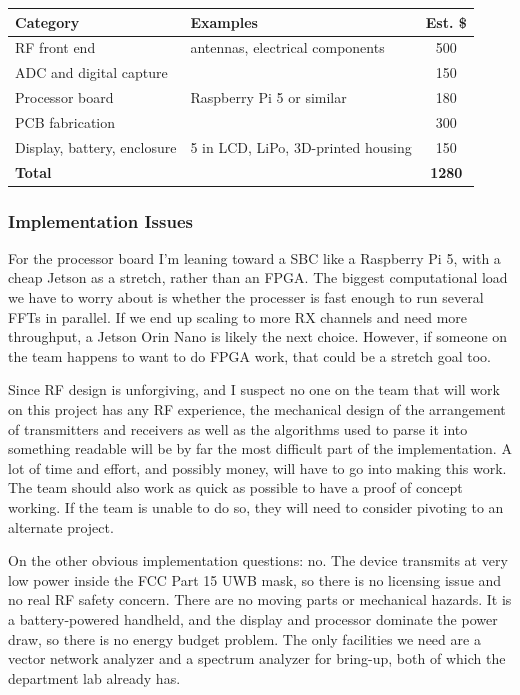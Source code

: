 \documentclass[11pt]{article}
\begin{document}
\begin{center}
\small
\begin{tabular}{p{5cm} p{8cm} c}
\hline
Category & Examples & Est. \$ \\
\hline
RF front end & antennas, electrical components & 500 \\
ADC and digital capture & & 150 \\
Processor board & Raspberry Pi 5 or similar & 180 \\
PCB fabrication & & 300 \\
Display, battery, enclosure & 5 in LCD, LiPo, 3D-printed housing & 150 \\
\hline
\textbf{Total} & & \textbf{1280} \\
\hline
\end{tabular}
\end{center}

\subsubsection*{Implementation Issues}

For the processor board I'm leaning toward a SBC like a Raspberry Pi 5, with a cheap Jetson as a stretch, rather than an FPGA. The biggest computational load we have to worry about is whether the processer is fast enough to run several FFTs in parallel. If we end up scaling to more RX channels and need more throughput, a Jetson Orin Nano is likely the next choice. However, if someone on the team happens to want to do FPGA work, that could be a stretch goal too. 

Since RF design is unforgiving, and I suspect no one on the team that will work on this project has any RF experience, the mechanical design of the arrangement of transmitters and receivers as well as the algorithms used to parse it into something readable will be by far the most difficult part of the implementation. A lot of time and effort, and possibly money, will have to go into making this work. The team should also work as quick as possible to have a proof of concept working. If the team is unable to do so, they will need to consider pivoting to an alternate project.

On the other obvious implementation questions: no. The device transmits at very low power inside the FCC Part 15 UWB mask, so there is no licensing issue and no real RF safety concern. There are no moving parts or mechanical hazards. It is a battery-powered handheld, and the display and processor dominate the power draw, so there is no energy budget problem. The only facilities we need are a vector network analyzer and a spectrum analyzer for bring-up, both of which the department lab already has.
\end{document}
